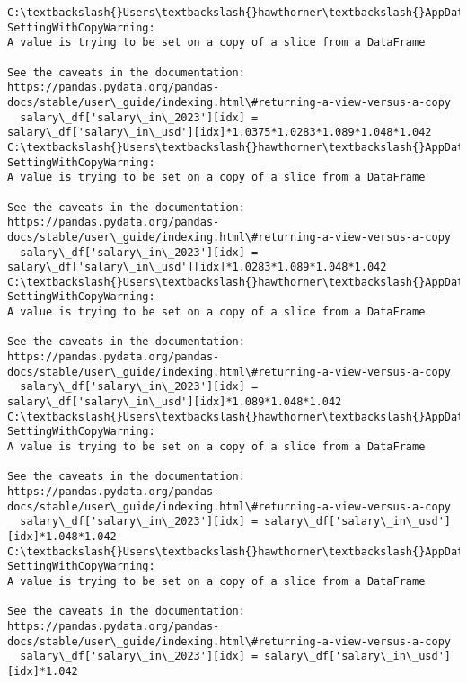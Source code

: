 \documentclass[11pt]{article}
\begin{document}
    \begin{Verbatim}[commandchars=\\\{\}]
C:\textbackslash{}Users\textbackslash{}hawthorner\textbackslash{}AppData\textbackslash{}Local\textbackslash{}Temp\textbackslash{}ipykernel\_22188\textbackslash{}49291514.py:5:
SettingWithCopyWarning:
A value is trying to be set on a copy of a slice from a DataFrame

See the caveats in the documentation: https://pandas.pydata.org/pandas-
docs/stable/user\_guide/indexing.html\#returning-a-view-versus-a-copy
  salary\_df['salary\_in\_2023'][idx] =
salary\_df['salary\_in\_usd'][idx]*1.0375*1.0283*1.089*1.048*1.042
C:\textbackslash{}Users\textbackslash{}hawthorner\textbackslash{}AppData\textbackslash{}Local\textbackslash{}Temp\textbackslash{}ipykernel\_22188\textbackslash{}49291514.py:7:
SettingWithCopyWarning:
A value is trying to be set on a copy of a slice from a DataFrame

See the caveats in the documentation: https://pandas.pydata.org/pandas-
docs/stable/user\_guide/indexing.html\#returning-a-view-versus-a-copy
  salary\_df['salary\_in\_2023'][idx] =
salary\_df['salary\_in\_usd'][idx]*1.0283*1.089*1.048*1.042
C:\textbackslash{}Users\textbackslash{}hawthorner\textbackslash{}AppData\textbackslash{}Local\textbackslash{}Temp\textbackslash{}ipykernel\_22188\textbackslash{}49291514.py:9:
SettingWithCopyWarning:
A value is trying to be set on a copy of a slice from a DataFrame

See the caveats in the documentation: https://pandas.pydata.org/pandas-
docs/stable/user\_guide/indexing.html\#returning-a-view-versus-a-copy
  salary\_df['salary\_in\_2023'][idx] =
salary\_df['salary\_in\_usd'][idx]*1.089*1.048*1.042
C:\textbackslash{}Users\textbackslash{}hawthorner\textbackslash{}AppData\textbackslash{}Local\textbackslash{}Temp\textbackslash{}ipykernel\_22188\textbackslash{}49291514.py:11:
SettingWithCopyWarning:
A value is trying to be set on a copy of a slice from a DataFrame

See the caveats in the documentation: https://pandas.pydata.org/pandas-
docs/stable/user\_guide/indexing.html\#returning-a-view-versus-a-copy
  salary\_df['salary\_in\_2023'][idx] = salary\_df['salary\_in\_usd'][idx]*1.048*1.042
C:\textbackslash{}Users\textbackslash{}hawthorner\textbackslash{}AppData\textbackslash{}Local\textbackslash{}Temp\textbackslash{}ipykernel\_22188\textbackslash{}49291514.py:13:
SettingWithCopyWarning:
A value is trying to be set on a copy of a slice from a DataFrame

See the caveats in the documentation: https://pandas.pydata.org/pandas-
docs/stable/user\_guide/indexing.html\#returning-a-view-versus-a-copy
  salary\_df['salary\_in\_2023'][idx] = salary\_df['salary\_in\_usd'][idx]*1.042
    \end{Verbatim}
\end{document}
